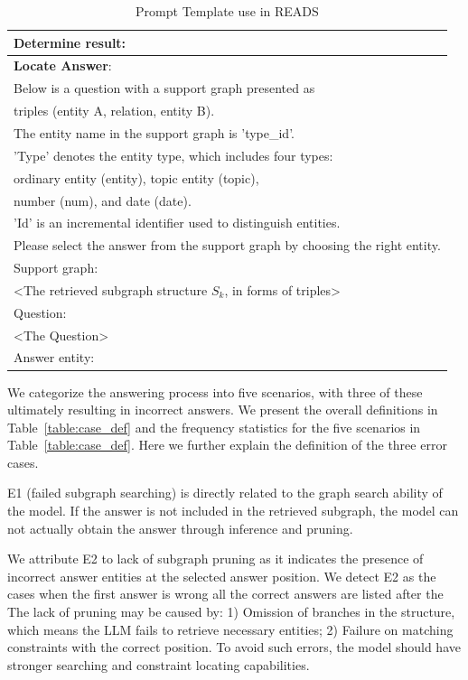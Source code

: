 \documentclass[11pt]{article}
\begin{document}
\begin{table}
{\begin{tabular}{l}
Determine result:\\ \hline
\textbf{Locate Answer}:\\
Below is a question with a support graph presented as\\ triples (entity A, relation, entity B). \\
The entity name in the support graph is 'type\_id'. \\
'Type' denotes the entity type, which includes four types:\\ ordinary entity (entity), topic entity (topic),\\
number (num), and date (date). \\
'Id' is an incremental identifier used to distinguish entities. \\
Please select the answer from the support graph by choosing the right entity.\\
Support graph:\\
<The retrieved subgraph structure $S_{k}$, in forms of triples>\\
Question:\\
<The Question>\\
Answer entity:\\ 
\hline
\end{tabular}
}
\caption{Prompt Template use in READS}
\label{table:prompt}
\end{table}

We categorize the answering process into five scenarios, with three of these ultimately resulting in incorrect answers. We present the overall definitions in Table~\ref{table:case_def} and the frequency statistics for the five scenarios in Table~\ref{table:case_def}. Here we further explain the definition of the three error cases.

E1 (failed subgraph searching) is directly related to the graph search ability of the model. If the answer is not included in the retrieved subgraph, the model can not actually obtain the answer through inference and pruning.

We attribute E2 to lack of subgraph pruning as it indicates the presence of incorrect answer entities at the selected answer position. We detect E2 as the cases when the first answer is wrong all the correct answers are listed after the  
The lack of pruning may be caused by: 1) Omission of branches in the structure, which means the LLM fails to retrieve necessary entities; 2) Failure on matching constraints with the correct position. To avoid such errors, the model should have stronger searching and constraint locating capabilities.
\end{document}
